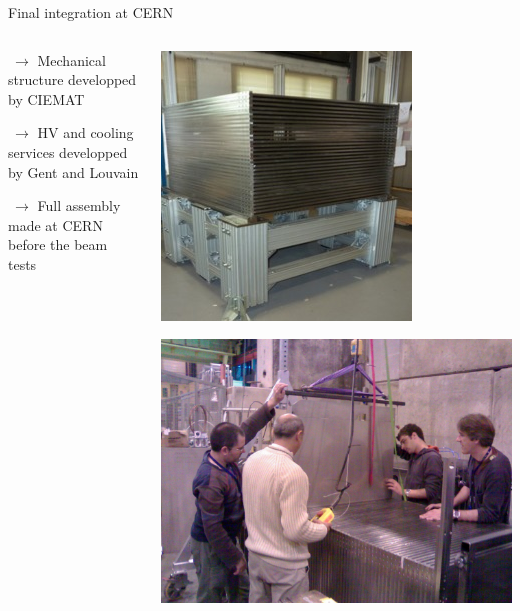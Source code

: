 \documentclass[10pt]{beamer}
\begin{document}
\begin{frame}{Final integration at CERN}
\begin{columns}
 \begin{column}{0.5\textwidth}
\begin{block}
        { 
          \par $ ~\rightarrow$ Mechanical structure developped by CIEMAT
          \par $ ~\rightarrow$ HV and cooling services developped by Gent and Louvain
          \par $ ~\rightarrow$ Full assembly made at CERN before the beam tests
          
        }
\end{block}
      \end{column}
      
      \begin{column}{0.5\textwidth}
 \centerline{\includegraphics[height=0.5\textheight]{jpg/ConstructionStructure.jpg}}
 \centerline{\includegraphics[height=0.5\textheight]{jpg/ConstructionInsertion.jpg}}

      \end{column}
    \end{columns}
\end{frame}
\end{document}
